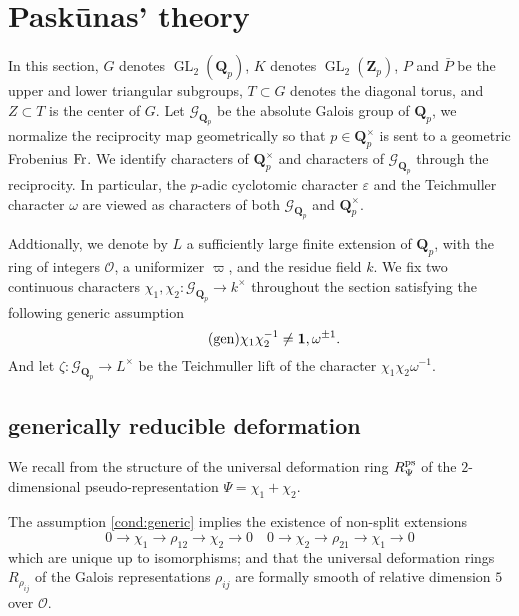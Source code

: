 \documentclass[leqno]{amsart}
\newcommand{\Gp}{\mathcal{G}_{\Qp}} %
\newcommand{\Fr}{\textnormal{Fr}} %
\newcommand{\ps}{\textnormal{ps}}
\DeclareMathOperator{\GL}{GL}
\newcommand{\Qp}{\mathbf{Q}_p}
\newcommand{\Zp}{\mathbf{Z}_p}
\newcommand{\oo}{\mathcal O}
\newcommand{\id}{\mathbf{1}}
\newcommand{\1}{\mathbf{1}}
\theoremstyle{definition}
\theoremstyle{remark}
\begin{document}
\section{Pask\={u}nas' theory}

In this section,
$G$ denotes  $\GL_2(\Qp)$, 
$K$ denotes  $\GL_2(\Zp)$,  
$P$ and  $\bar{P}$ 
be the upper and lower triangular subgroups,
$T\subset G$ denotes the diagonal torus,
and  $Z\subset T$ is the center of  $G$.
Let  $\Gp$ be the absolute Galois group of  $\Qp$,
we normalize the reciprocity map  geometrically
so that  $p\in \Qp^\times$
is sent to a geometric Frobenius  $\Fr$.
We identify characters of  $\Qp^\times$
and characters of  $\Gp$ through the reciprocity.
In particular, 
the $p$-adic cyclotomic character $\varepsilon$ 
and the Teichmuller character $\omega$
are viewed as characters of both  $\Gp$ and  $\Qp^\times$.

Addtionally,
we denote by $L$ a sufficiently large 
finite extension of  $\Qp$,
with the ring of integers  $\oo$,
a uniformizer  $\varpi$,
and the residue field $k$.
We fix 
two continuous characters
$\chi_1,\chi_2\colon \Gp\to k^\times$ 
throughout the section satisfying
the following generic assumption
\begin{equation}\label{cond:generic}\tag{\text{gen}}
	\chi_1\chi_2^{-1}\neq \id,\omega^{\pm1}.
\end{equation}
And let $\zeta\colon \Gp\to L^\times$
be the Teichmuller lift of the character  $\chi_1\chi_2\omega^{-1}$.



\subsection{generically reducible deformation}

We recall from \cite[\S B.1]{pask}
the structure of the universal deformation ring $R_{\Psi}^{\ps}$
of the $2$-dimensional pseudo-representation $\Psi=\chi_1+\chi_2$. 

The assumption \eqref{cond:generic}
implies the existence of non-split extensions
\begin{equation*}
    0\to \chi_1\to \rho_{12}\to \chi_2\to 0\quad
    0\to \chi_2\to \rho_{21}\to \chi_1\to 0
\end{equation*}
which are unique up to isomorphisms;
and that the universal deformation rings
$R_{\rho_{ij}}$ of the Galois representations $\rho_{ij}$
are formally smooth of relative dimension $5$ over $\oo$.
\end{document}
